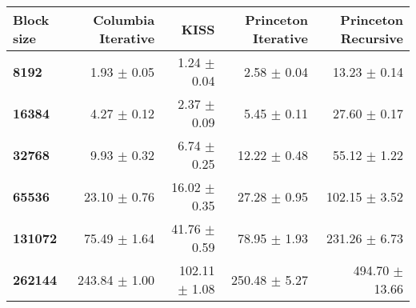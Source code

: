 \begin{tabular}{lrrrr}\toprule
\textbf{Block size}  & \textbf{Columbia Iterative} & \textbf{KISS} & \textbf{Princeton Iterative} & \textbf{Princeton Recursive}\\\midrule
\textbf{8192}  & 1.93 $\pm$ 0.05 & 1.24 $\pm$ 0.04 & 2.58 $\pm$ 0.04 & 13.23 $\pm$ 0.14\\
\textbf{16384}  & 4.27 $\pm$ 0.12 & 2.37 $\pm$ 0.09 & 5.45 $\pm$ 0.11 & 27.60 $\pm$ 0.17\\
\textbf{32768}  & 9.93 $\pm$ 0.32 & 6.74 $\pm$ 0.25 & 12.22 $\pm$ 0.48 & 55.12 $\pm$ 1.22\\
\textbf{65536}  & 23.10 $\pm$ 0.76 & 16.02 $\pm$ 0.35 & 27.28 $\pm$ 0.95 & 102.15 $\pm$ 3.52\\
\textbf{131072}  & 75.49 $\pm$ 1.64 & 41.76 $\pm$ 0.59 & 78.95 $\pm$ 1.93 & 231.26 $\pm$ 6.73\\
\textbf{262144} & 243.84 $\pm$ 1.00 & 102.11 $\pm$ 1.08 & 250.48 $\pm$ 5.27 & 494.70 $\pm$ 13.66\\
\bottomrule
\end{tabular}
